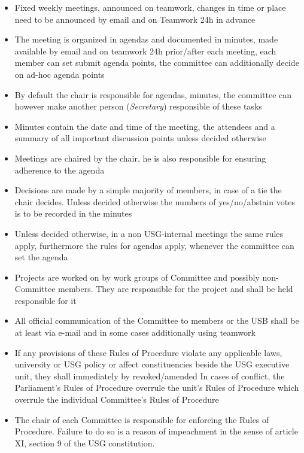 \begin{itemize}
	\item Fixed weekly meetings, announced on teamwork, changes in time or place need to be announced by email and on Teamwork 24h in advance
	\item The meeting is organized in agendas and documented in minutes, made available by email and on teamwork 24h prior/after each meeting, each member can set submit agenda points, the committee can additionally decide on ad-hoc agenda points
	\item By default the chair is responsible for agendas, minutes, the committee can however make another person (\emph{Secretary}) responsible of these tasks
	\item Minutes contain the date and time of the meeting, the attendees and a summary of all important discussion points unless decided otherwise
	\item Meetings are chaired by the chair, he is also responsible for ensuring adherence to the agenda
	\item Decisions are made by a simple majority of members, in case of a tie the chair decides. Unless decided otherwise the numbers of yes/no/abstain votes is to be recorded in the minutes
	\item Unless decided otherwise, in a non USG-internal meetings the same rules apply, furthermore the rules for agendas apply, whenever the committee can set the agenda
	\item Projects are worked on by work groups of Committee and possibly non-Committee members. They are responsible for the project and shall be held responsible for it
	\item All official communication of the Committee to members or the USB shall be at least via e-mail and in some cases additionally using teamwork
	\item If any provisions of these Rules of Procedure violate any applicable laws, university or USG policy or affect constituencies beside the USG executive unit, they shall immediately by revoked/amended
	In cases of conflict, the Parliament's Rules of Procedure overrule the unit's Rules of Procedure which overrule the individual Committee's Rules of Procedure
	\item The chair of each Committee is responsible for enforcing the Rules of Procedure. Failure to do so is a reason of impeachment in the sense of article XI, section 9 of the USG constitution.
\end{itemize}